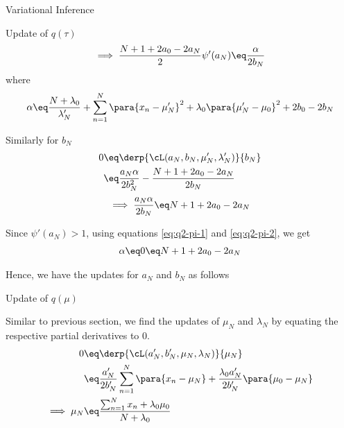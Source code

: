 \documentclass{article}
\begin{document}
\begin{question}
\begin{qsection}{Variational Inference}
\begin{qsubsection}{\boldmath Update of $q(\tau)$}
			\begin{equation}
				\implies	\frac{N + 1 + 2 a_0 - 2 a_N}{2} \psi'(a_N)	\eq	\frac{\alpha}{2 b_N}
				\label{eq:q2-pi-1}
			\end{equation}
			where
			\begin{align*}
				\alpha	\eq	\frac{N + \lambda_0}{\lambda'_N} + \sum_{n = 1}^N \para{x_n - \mu'_N}^2 + \lambda_0 \para{\mu'_N - \mu_0}^2 + 2 b_0 - 2 b_N
			\end{align*}

			Similarly for $b_N$
			\begin{align*}
				0	&\eq	\derp{\cL(a_N, b_N, \mu'_N, \lambda'_N)}{b_N} \\
				&\eq	\frac{a_N \alpha}{2 b_N^2} - \frac{N + 1 + 2 a_0 - 2 a_N}{2 b_N}
			\end{align*}
			\begin{equation}
				\implies \frac{a_N \alpha}{2 b_N}	\eq	N + 1 + 2 a_0 - 2 a_N
				\label{eq:q2-pi-2}
			\end{equation}

			Since $\psi'(a_N) > 1$, using equations \ref{eq:q2-pi-1} and \ref{eq:q2-pi-2}, we get
			\begin{align*}
				\alpha	\eq	0	\eq	N + 1 + 2 a_0 - 2 a_N
			\end{align*}

			Hence, we have the updates for $a_N$ and $b_N$ as follows

		\end{qsubsection}

	\end{qsection}

	\begin{qsubsection}{\boldmath Update of $q(\mu)$}

		Similar to previous section, we find the updates of $\mu_N$ and $\lambda_N$ by equating the respective partial derivatives to 0.
		\begin{align*}
			0	&\eq	\derp{\cL(a'_N, b'_N, \mu_N, \lambda_N)}{\mu_N} \\
			&\eq	\frac{a'_N}{2 b'_N} \sum_{n = 1}^N \para{x_n - \mu_N} + \frac{\lambda_0 a'_N}{2 b'_N} \para{\mu_0 - \mu_N} \\
			\implies \mu_N	&\eq	\frac{\sum_{n = 1}^N x_n + \lambda_0 \mu_0}{N + \lambda_0}
		\end{align*}


\end{qsubsection}
\end{question}
\end{document}
